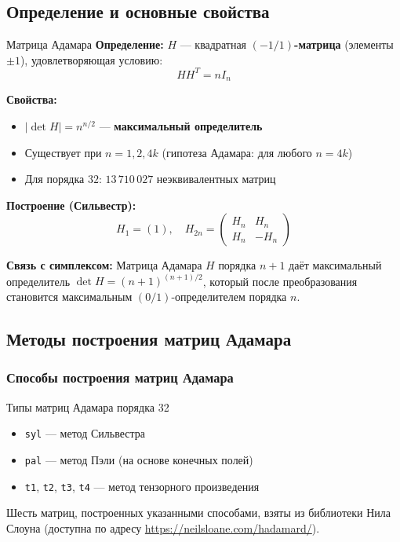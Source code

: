 \documentclass{beamer}
\begin{document}
\subsection{Определение и основные свойства}
\begin{frame}{Матрица Адамара}
    \textbf{Определение:} $H$ — квадратная \textbf{$(-1/1)$-матрица} (элементы $\pm 1$), удовлетворяющая условию:
    \[
    H H^T = n I_n
    \]

    \vspace{0.3cm}

    \textbf{Свойства:}
    \begin{itemize}
        \item $|\det H| = n^{n/2}$ — \textbf{максимальный определитель}
        \item Существует при $n = 1, 2, 4k$ (гипотеза Адамара: для любого $n = 4k$)
        \item Для порядка $32$: $13\,710\,027$ неэквивалентных матриц
    \end{itemize}

    \vspace{0.3cm}

    \textbf{Построение (Сильвестр):}
    \[
    H_{1} = (1), \quad H_{2n} = \begin{pmatrix} H_n & H_n \\ H_n & -H_n \end{pmatrix}
    \]

    \vspace{0.3cm}

    \textbf{Связь с симплексом:}
    Матрица Адамара $H$ порядка $n+1$ даёт максимальный определитель $\det H = (n+1)^{(n+1)/2}$, который после преобразования становится максимальным $(0/1)$-определителем порядка $n$.
\end{frame}

\subsection{Методы построения матриц Адамара}

\subsubsection{Способы построения матриц Адамара}
\begin{frame}{Типы матриц Адамара порядка 32}
    \begin{itemize}
        \item \texttt{syl} — метод Сильвестра
        \item \texttt{pal} — метод Пэли (на основе конечных полей)
        \item \texttt{t1}, \texttt{t2}, \texttt{t3}, \texttt{t4} — метод тензорного произведения
    \end{itemize}

    \vspace{0.3cm}

    Шесть матриц, построенных указанными способами, взяты из библиотеки Нила Слоуна (доступна по адресу \url{https://neilsloane.com/hadamard/}).
\end{frame}
\end{document}

